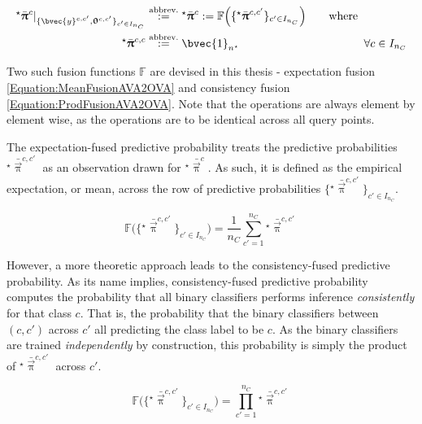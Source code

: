 				\begin{equation}
					\begin{aligned}
						{^{\star}}\bar{\vec{\uppi}}^{c} |_{\{ \bvec{y}^{c, c'}, \vec{\uptheta}^{c, c'} \}_{c' \in I_{n_{C}}}} &\stackrel{\text{abbrev.}}{:=} {^{\star}}\bar{\vec{\uppi}}^{c} := \mathbb{F}\Big(\{{^{\star}}\bar{\vec{\uppi}}^{c, c'}\}_{c' \in I_{n_{C}}}\Big) \qquad \text{where} \\
						{^{\star}}\bar{\vec{\uppi}}^{c, c} &\stackrel{\text{abbrev.}}{:=} \bvec{1}_{n^{\star}} \qquad \qquad \qquad \qquad \quad \qquad \forall c \in I_{n_{C}}
					\end{aligned}
				\label{Equation:AVA2OVA}
				\end{equation}
				
				Two such fusion functions $\mathbb{F}$ are devised in this thesis - expectation fusion \eqref{Equation:MeanFusionAVA2OVA} and consistency fusion \eqref{Equation:ProdFusionAVA2OVA}. Note that the operations are always element by element wise, as the operations are to be identical across all query points.
				
				The expectation-fused predictive probability treats the predictive probabilities ${^{\star}}\bar{\vec{\uppi}}^{c, c'}$ as an observation drawn for ${^{\star}}\bar{\vec{\uppi}}^{c}$. As such, it is defined as the empirical expectation, or mean, across the row of predictive probabilities $\{{^{\star}}\bar{\vec{\uppi}}^{c, c'}\}_{c' \in I_{n_{C}}}$. 
				
				\begin{equation}
					\mathbb{F}\Big(\{{^{\star}}\bar{\vec{\uppi}}^{c, c'}\}_{c' \in I_{n_{C}}}\Big) = \frac{1}{n_{C}}\sum_{c' = 1}^{n_{C}} {^{\star}}\bar{\vec{\uppi}}^{c, c'}
				\label{Equation:MeanFusionAVA2OVA}
				\end{equation}
				
				However, a more theoretic approach leads to the consistency-fused predictive probability. As its name implies, consistency-fused predictive probability computes the probability that all binary classifiers performs inference \textit{consistently} for that class $c$. That is, the probability that the binary classifiers between $(c, c')$ across $c'$ all predicting the class label to be $c$. As the binary classifiers are trained \textit{independently} by construction, this probability is simply the product of ${^{\star}}\bar{\vec{\uppi}}^{c, c'}$ across $c'$.
				
				\begin{equation}
					\mathbb{F}\Big(\{{^{\star}}\bar{\vec{\uppi}}^{c, c'}\}_{c' \in I_{n_{C}}}\Big) = \prod_{c' = 1}^{n_{C}} {^{\star}}\bar{\vec{\uppi}}^{c, c'}
				\label{Equation:ProdFusionAVA2OVA}
				\end{equation}
				
